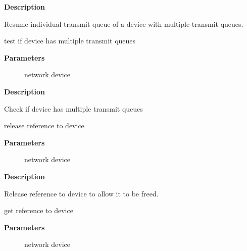 \documentclass[a4paper,8pt,english]{sphinxmanual}
\begin{document}
\textbf{Description}

Resume individual transmit queue of a device with multiple transmit queues.

\begin{fulllineitems}
\label{networking/kapi:c.netif_is_multiqueue}
test if device has multiple transmit queues

\end{fulllineitems}


\textbf{Parameters}
\begin{description}
\item[{}] \leavevmode
network device

\end{description}

\textbf{Description}

Check if device has multiple transmit queues

\begin{fulllineitems}
\label{networking/kapi:c.dev_put}
release reference to device

\end{fulllineitems}


\textbf{Parameters}
\begin{description}
\item[{}] \leavevmode
network device

\end{description}

\textbf{Description}

Release reference to device to allow it to be freed.

\begin{fulllineitems}
\label{networking/kapi:c.dev_hold}
get reference to device

\end{fulllineitems}


\textbf{Parameters}
\begin{description}
\item[{}] \leavevmode
network device

\end{description}
\end{document}
